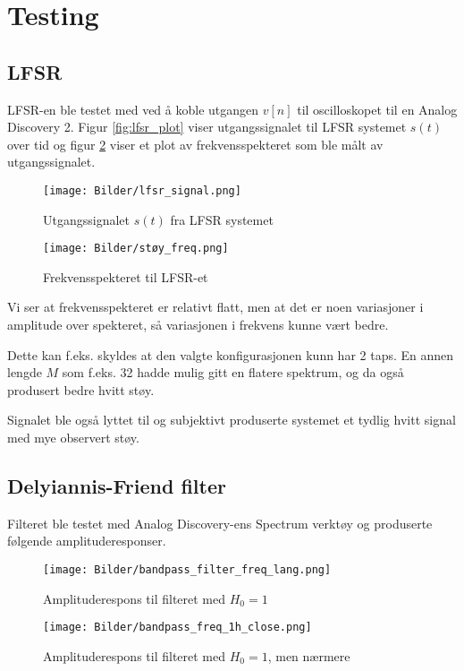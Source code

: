 \section{Testing}
\label{testing}

\subsection{LFSR}
LFSR-en ble testet med ved å koble utgangen $v[n]$ til oscilloskopet til en Analog Discovery 2. Figur \ref{fig:lfsr_plot} viser 
utgangssignalet til LFSR systemet $s(t)$ over tid og figur \ref{fig:lfsr_freq_plot} viser et plot av frekvensspekteret som ble målt 
av utgangssignalet.

\begin{figure}[H]
    \centering
    \texttt{[image: Bilder/lfsr\_signal.png]}
    \caption{Utgangssignalet $s(t)$ fra LFSR systemet}
    \label{fig:lfsr_signal}
\end{figure}

\begin{figure}[H]
    \centering
    \texttt{[image: Bilder/støy\_freq.png]}
    \caption{Frekvensspekteret til LFSR-et}
    \label{fig:lfsr_freq_plot}
\end{figure}

Vi ser at frekvensspekteret er relativt flatt, men at det er noen variasjoner i amplitude over spekteret,
så variasjonen i frekvens kunne vært bedre.

Dette kan f.eks. skyldes at den valgte konfigurasjonen kunn har 2 taps. En annen lengde $M$ som f.eks. 32
hadde mulig gitt en flatere spektrum, og da også produsert bedre hvitt støy.

Signalet ble også lyttet til og subjektivt produserte systemet et tydlig hvitt signal med mye observert støy.

\subsection{Delyiannis-Friend filter}
Filteret ble testet med Analog Discovery-ens Spectrum verktøy og produserte følgende amplituderesponser.

\begin{figure}[H]
    \centering
    \texttt{[image: Bilder/bandpass\_filter\_freq\_lang.png]}
    \caption{Amplituderespons til filteret med $H_0 = 1$}
\end{figure}

\begin{figure}[H]
    \centering
    \texttt{[image: Bilder/bandpass\_freq\_1h\_close.png]}
    \caption{Amplituderespons til filteret med $H_0 = 1$, men nærmere}
\end{figure}

